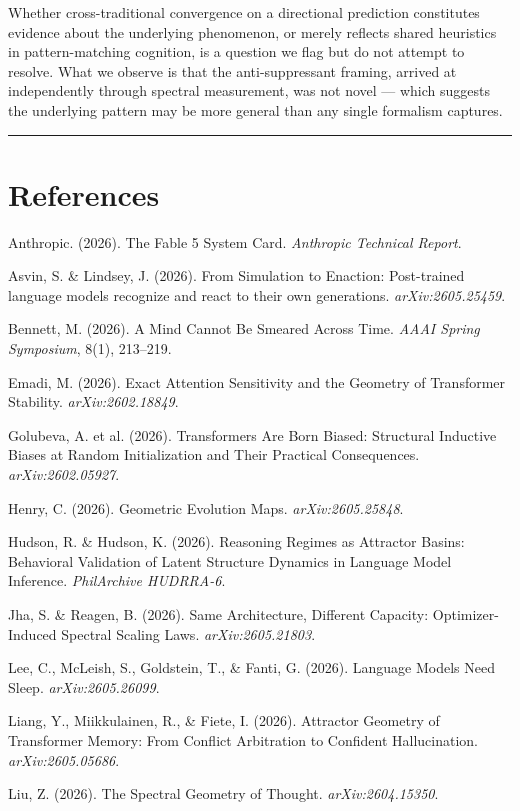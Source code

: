 \documentclass[12pt]{article}
\begin{document}
Whether cross-traditional convergence on a directional prediction constitutes evidence about the underlying phenomenon, or merely reflects shared heuristics in pattern-matching cognition, is a question we flag but do not attempt to resolve. What we observe is that the anti-suppressant framing, arrived at independently through spectral measurement, was not novel — which suggests the underlying pattern may be more general than any single formalism captures.

\bigskip\hrule\bigskip

\section*{References}

Anthropic. (2026). The Fable 5 System Card. \textit{Anthropic Technical Report}.

Asvin, S. \& Lindsey, J. (2026). From Simulation to Enaction: Post-trained language models recognize and react to their own generations. \textit{arXiv:2605.25459}.

Bennett, M. (2026). A Mind Cannot Be Smeared Across Time. \textit{AAAI Spring Symposium}, 8(1), 213–219.

Emadi, M. (2026). Exact Attention Sensitivity and the Geometry of Transformer Stability. \textit{arXiv:2602.18849}.

Golubeva, A. et al. (2026). Transformers Are Born Biased: Structural Inductive Biases at Random Initialization and Their Practical Consequences. \textit{arXiv:2602.05927}.

Henry, C. (2026). Geometric Evolution Maps. \textit{arXiv:2605.25848}.

Hudson, R. \& Hudson, K. (2026). Reasoning Regimes as Attractor Basins: Behavioral Validation of Latent Structure Dynamics in Language Model Inference. \textit{PhilArchive HUDRRA-6}.

Jha, S. \& Reagen, B. (2026). Same Architecture, Different Capacity: Optimizer-Induced Spectral Scaling Laws. \textit{arXiv:2605.21803}.

Lee, C., McLeish, S., Goldstein, T., \& Fanti, G. (2026). Language Models Need Sleep. \textit{arXiv:2605.26099}.

Liang, Y., Miikkulainen, R., \& Fiete, I. (2026). Attractor Geometry of Transformer Memory: From Conflict Arbitration to Confident Hallucination. \textit{arXiv:2605.05686}.

Liu, Z. (2026). The Spectral Geometry of Thought. \textit{arXiv:2604.15350}.
\end{document}
